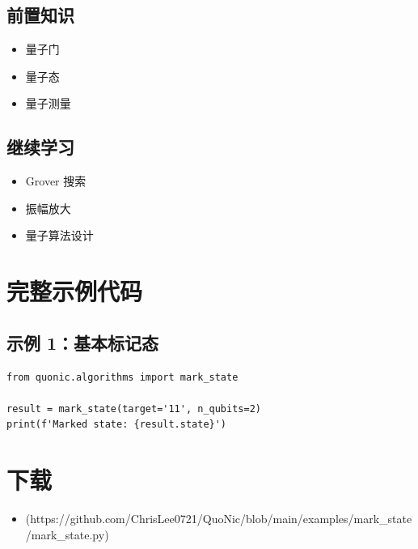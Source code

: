 \documentclass[12pt,a4paper]{article}
\begin{document}
\subsection{前置知识}
\begin{itemize}
  \item 量子门
  \item 量子态
  \item 量子测量
\end{itemize}

\subsection{继续学习}
\begin{itemize}
  \item Grover 搜索
  \item 振幅放大
  \item 量子算法设计
\end{itemize}

\section{完整示例代码}

\subsection{示例 1：基本标记态}

\begin{verbatim}
from quonic.algorithms import mark_state

result = mark_state(target='11', n_qubits=2)
print(f'Marked state: {result.state}')
\end{verbatim}

\section{下载}

\begin{itemize}
  \item [mark\_state.py](https://github.com/ChrisLee0721/QuoNic/blob/main/examples/mark_state/mark_state.py)
\end{itemize}
\end{document}
